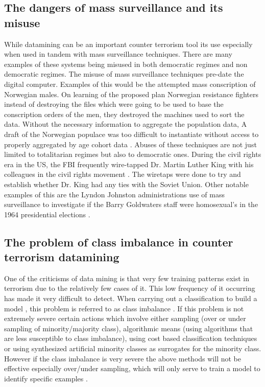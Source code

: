 \subsection{The dangers of mass surveillance and its misuse}
While datamining can be an important counter terrorism tool its use especially when used in tandem with mass surveillance techniques. There are many examples of these systems being misused in both democratic regimes and non democratic regimes. The misuse of mass surveillance techniques pre-date the digital computer. Examples of this would  be the attempted mass conscription of Norwegian males. On learning of the proposed plan Norwegian resistance fighters instead of destroying the files which were going to be used to base the conscription orders of the men, they destroyed the machines used to sort the data. Without the necessary information to aggregate the population data, A draft of the Norwegian populace was too difficult to instantiate without access to properly aggregated by age cohort data \citep{bignami2007european}. Abuses of these techniques are not just limited to totalitarian regimes but also to democratic ones. During the civil rights era in the US, the FBI frequently wire-tapped Dr. Martin Luther King with his colleagues in the civil rights movement \citep{garrow2015fbi}. The wiretaps were done to try and establish whether Dr. King had any ties with the Soviet Union. Other notable examples of this are the Lyndon Johnston administrations use of mass surveillance to investigate if the Barry Goldwaters staff were homosexual's in the 1964 presidential elections \citep{sales2014domesticating}.

\subsection{The problem of class imbalance in counter terrorism datamining} 
One of the criticisms of data mining is that very few training patterns exist in terrorism due to the relatively few cases of it. This low frequency of it occurring has made it very difficult to detect. When carrying out a classification to build a model , this problem is referred to as class imbalance \citep{SASClassimbalance2015}. If this problem is not extremely severe certain actions which involve either sampling (over or under sampling of minority/majority class), algorithmic means (using algorithms that are less susceptible to class imbalance), using cost based classification techniques or using synthesized artificial minority classes as surrogates for the minority class. However if the class imbalance is very severe the above methods will not be effective especially over/under sampling, which will only serve to train a model to identify specific examples \citep{jonas2006effective}.

